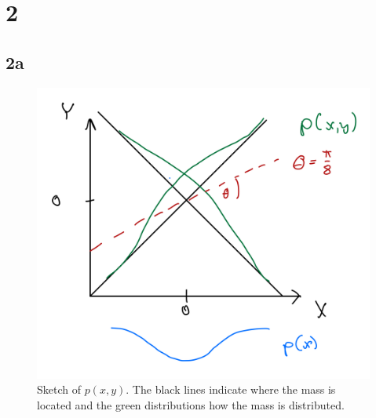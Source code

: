 
\section*{2}

\subsection*{2a}

\begin{figure}[H]
    \centering
    \includegraphics[width=0.8\linewidth]{p_xy.png}
    \caption{Sketch of $p(x, y)$. The black lines indicate where the mass is located and the green
    distributions how the mass is distributed.}
    \label{fig:p_xy}
\end{figure}

